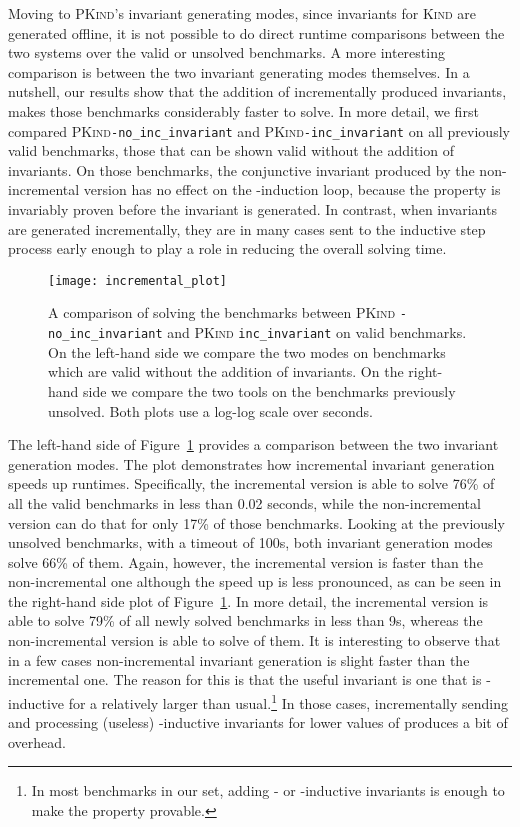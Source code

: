 \documentclass[submission,copyright,creativecommons]{eptcs}
\newcommand{\Kind}{\textrm{\textsc{Kind}}\xspace}
\newcommand{\PKind}{\textrm{\textsc{PKind}}\xspace}
\begin{document}
Moving to \PKind's invariant generating modes,
since invariants for \Kind are generated offline,
it is not possible to do direct runtime comparisons 
between the two systems over the valid or unsolved benchmarks.
A more interesting comparison is between 
the two invariant generating modes themselves.
In a nutshell, our results show that 
the addition of incrementally produced invariants, 
makes those benchmarks considerably faster to solve.  
In more detail,
we first compared \PKind \texttt{\small -no\_inc\_invariant} and 
\PKind \texttt{\small -inc\_invariant} on all previously valid benchmarks,
those that can be shown valid without the addition of invariants. 
On those benchmarks, the conjunctive invariant produced 
by the non-incremental version has no effect on the -induction loop,
because the property is invariably proven before the invariant is generated.
In contrast, when invariants are generated incrementally, 
they are in many cases sent to the inductive step process
early enough to play a role in reducing the overall solving time.




\begin{figure}[t]
\centering
\texttt{[image: incremental\_plot]} 
\caption{ A comparison of solving the benchmarks between \PKind
  \texttt{\small -no\_inc\_invariant} and \PKind
  \texttt{\small inc\_invariant} on valid benchmarks. On the left-hand side
  we compare the two modes on benchmarks which are valid without the
  addition of invariants.  On the right-hand side we compare the two
  tools on the benchmarks previously unsolved.
  Both plots use a log-log scale over seconds.}
\label{fig:incremental}
\end{figure}

The left-hand side of Figure~\ref{fig:incremental} provides a
comparison between the two invariant generation modes. The plot demonstrates how
incremental invariant generation speeds up runtimes. 
Specifically, the incremental version is able to solve
76\% of all the valid benchmarks in less than 0.02 seconds, while the
non-incremental version can do that for only 17\% of those benchmarks.
Looking at the previously unsolved benchmarks, with a timeout of 100s, 
both invariant generation modes solve 66\% of them.  Again, however, the
incremental version is faster than the non-incremental one
although the speed up is less pronounced,
as can be seen in the right-hand side plot of Figure~\ref{fig:incremental}. 
In more detail, the incremental version is able to solve 79\% of all newly
solved benchmarks in less than 9s, whereas the non-incremental version
is able to solve  of them.  
It is interesting to observe that in a few
cases non-incremental invariant generation is slight faster than the
incremental one.  The reason for this is that the useful invariant is
one that is -inductive for a relatively larger  than
usual.\footnote{ In most benchmarks in our set, adding - or
  -inductive invariants is enough to make the property provable.  }
In those cases, incrementally sending and processing (useless)
-inductive invariants for lower values of  produces a bit of
overhead.
\end{document}
